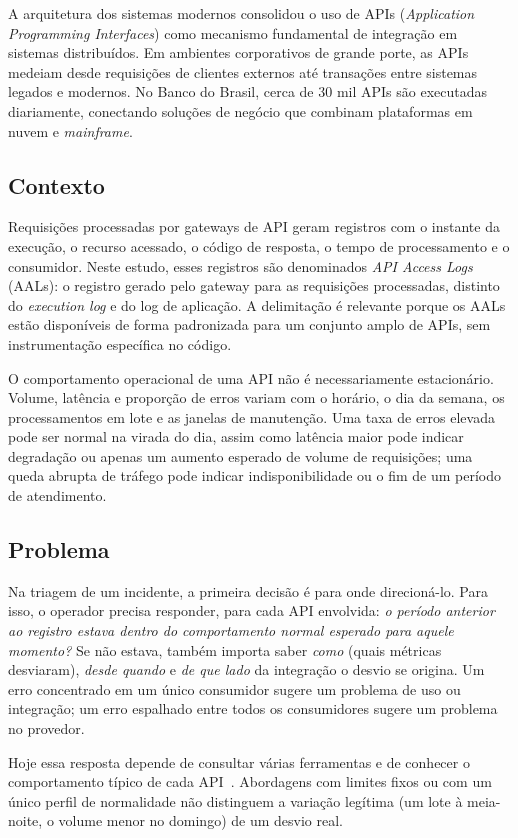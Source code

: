 \documentclass[sigconf,nonacm]{acmart}
\begin{document}
A arquitetura dos sistemas modernos consolidou o uso de APIs (\emph{Application Programming Interfaces}) como mecanismo fundamental de integração em sistemas distribuídos. Em ambientes corporativos de grande porte, as APIs medeiam desde requisições de clientes externos até transações entre sistemas legados e modernos. No Banco do Brasil, cerca de 30 mil APIs são executadas diariamente, conectando soluções de negócio que combinam plataformas em nuvem e \emph{mainframe}.

\subsection{Contexto}
Requisições processadas por gateways de API geram registros com o instante da execução, o recurso acessado, o código de resposta, o tempo de processamento e o consumidor. Neste estudo, esses registros são denominados \emph{API Access Logs} (AALs): o registro gerado pelo gateway para as requisições processadas, distinto do \emph{execution log} e do log de aplicação. A delimitação é relevante porque os AALs estão disponíveis de forma padronizada para um conjunto amplo de APIs, sem instrumentação específica no código.

O comportamento operacional de uma API não é necessariamente estacionário. Volume, latência e proporção de erros variam com o horário, o dia da semana, os processamentos em lote e as janelas de manutenção. Uma taxa de erros elevada pode ser normal na virada do dia, assim como latência maior pode indicar degradação ou apenas um aumento esperado de volume de requisições; uma queda abrupta de tráfego pode indicar indisponibilidade ou o fim de um período de atendimento.

\subsection{Problema}
Na triagem de um incidente, a primeira decisão é para onde direcioná-lo. Para isso, o operador precisa responder, para cada API envolvida: \emph{o período anterior ao registro estava dentro do comportamento normal esperado para aquele momento?} Se não estava, também importa saber \emph{como} (quais métricas desviaram), \emph{desde quando} e \emph{de que lado} da integração o desvio se origina. Um erro concentrado em um único consumidor sugere um problema de uso ou integração; um erro espalhado entre todos os consumidores sugere um problema no provedor.

Hoje essa resposta depende de consultar várias ferramentas e de conhecer o comportamento típico de cada API~\citep{zhang2025isre}. Abordagens com limites fixos ou com um único perfil de normalidade não distinguem a variação legítima (um lote à meia-noite, o volume menor no domingo) de um desvio real.
\end{document}
